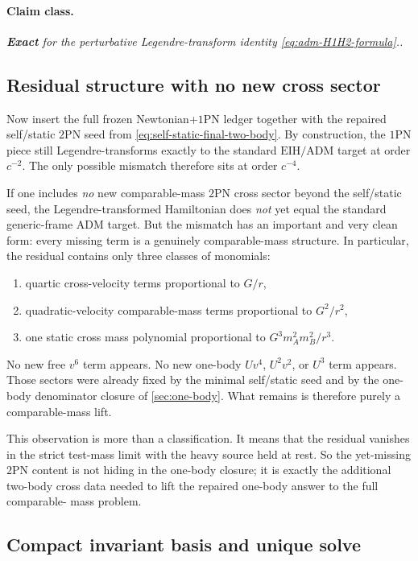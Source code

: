 \documentclass[11pt]{article}
\newcommand{\OnePN}{\mathrm{1PN}}
\newcommand{\TwoPN}{\mathrm{2PN}}
\newcommand{\ADM}{\mathrm{ADM}}
\newcommand{\EIH}{\mathrm{EIH}}
\newcommand{\Exact}{\textbf{Exact}}
\newcommand{\claimclass}[1]{\paragraph{Claim class.}\emph{#1.}}
\begin{document}
\claimclass{\Exact{} for the perturbative Legendre-transform identity
\cref{eq:adm-H1H2-formula}.}

\subsection{Residual structure with no new cross sector}
\label{sec:adm-residual-structure}

Now insert the full frozen Newtonian+\(\OnePN\) ledger together with the repaired
self/static \(\TwoPN\) seed from \cref{eq:self-static-final-two-body}.  By
construction, the \(\OnePN\) piece still Legendre-transforms exactly to the standard
\(\EIH/\ADM\) target at order \(c^{-2}\).  The only possible mismatch therefore sits
at order \(c^{-4}\).

If one includes \emph{no} new comparable-mass \(\TwoPN\) cross sector beyond the
self/static seed, the Legendre-transformed Hamiltonian does \emph{not} yet equal the
standard generic-frame \(\ADM\) target.  But the mismatch has an important and very
clean form: every missing term is a genuinely comparable-mass structure.  In
particular, the residual contains only three classes of monomials:
\begin{enumerate}
\item quartic cross-velocity terms proportional to \(G/r\),
\item quadratic-velocity comparable-mass terms proportional to \(G^2/r^2\),
\item one static cross mass polynomial proportional to \(G^3 m_A^2 m_B^2/r^3\).
\end{enumerate}
No new free \(v^6\) term appears.  No new one-body \(Uv^4\), \(U^2v^2\), or \(U^3\)
term appears.  Those sectors were already fixed by the minimal self/static seed and by
the one-body denominator closure of \cref{sec:one-body}.  What remains is therefore
purely a comparable-mass lift.

This observation is more than a classification.  It means that the residual vanishes in
the strict test-mass limit with the heavy source held at rest.  So the yet-missing
\(\TwoPN\) content is not hiding in the one-body closure; it is exactly the additional
two-body cross data needed to lift the repaired one-body answer to the full comparable-
mass problem.

\subsection{Compact invariant basis and unique solve}
\label{sec:adm-unique-solve}
\end{document}

